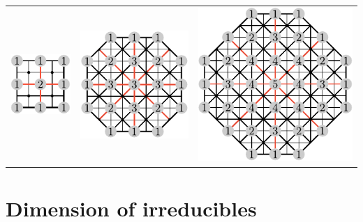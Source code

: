 \documentclass[11pt,oneside]{article}
\begin{document}
\begin{center}
\begin{tabular}{ c c c }
  \includegraphics[scale=0.7]{images/so5_weights_20.pdf}
& \includegraphics[scale=0.7]{images/so5_weights_21.pdf}
& \includegraphics[scale=0.7]{images/so5_weights_22.pdf}
\end{tabular}
\end{center}


\section{Dimension of irreducibles}

\end{document}
